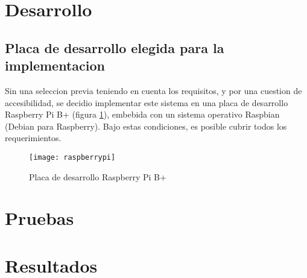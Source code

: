 
\section{Desarrollo} %
\label{sec:desarrollo}

\subsection{Placa de desarrollo elegida para la implementacion} %
\label{sub:placa_de_desarrollo_elegida_para_la_implementacion}

Sin una seleccion previa teniendo en cuenta los requisitos, y por una cuestion de accesibilidad, se decidio implementar este sistema en una placa de desarrollo Raspberry Pi B+ (figura \ref{fig:raspberrypi}), embebida con un sistema operativo Raspbian (Debian para Raspberry). Bajo estas condiciones, es posible cubrir todos los requerimientos.

\begin{figure}[h]
  \centering
  \texttt{[image: raspberrypi]}
  \caption{Placa de desarrollo Raspberry Pi B+}\label{fig:raspberrypi}
\end{figure}


\section{Pruebas} %
\label{sec:pruebas}


\section{Resultados} %
\label{sec:resultados}


